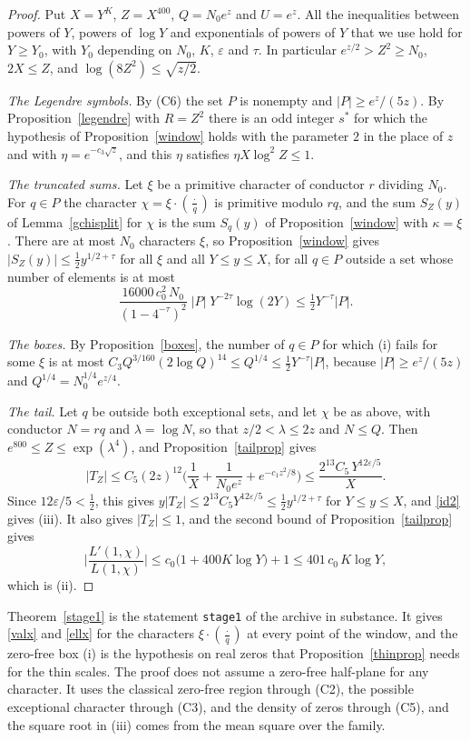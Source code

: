 \documentclass[11pt,letterpaper]{article}
\numberwithin{equation}{section}
\begin{document}
\begin{proof}
Put $X=Y^K$, $Z=X^{400}$, $Q=N_0e^z$ and $U=e^z$. All the inequalities between powers of $Y$, powers of $\log Y$ and exponentials of powers of $Y$ that we use hold for $Y\ge Y_0$, with $Y_0$ depending on $N_0$, $K$, $\varepsilon$ and $\tau$. In particular $e^{z/2}>Z^2\ge N_0$, $2X\le Z$, and $\log(8Z^2)\le\sqrt{z/2}$.

\emph{The Legendre symbols.} By (C6) the set $P$ is nonempty and $|P|\ge e^z/(5z)$. By Proposition~\ref{legendre} with $R=Z^2$ there is an odd integer $s^\ast$ for which the hypothesis of Proposition~\ref{window} holds with the parameter $2$ in the place of $z$ and with $\eta=e^{-c_3\sqrt z}$, and this $\eta$ satisfies $\eta X\log^2Z\le1$.

\emph{The truncated sums.} Let $\xi$ be a primitive character of conductor $r$ dividing $N_0$. For $q\in P$ the character $\chi=\xi\cdot(\tfrac{\cdot}{q})$ is primitive modulo $rq$, and the sum $S_Z(y)$ of Lemma~\ref{gchisplit} for $\chi$ is the sum $S_q(y)$ of Proposition~\ref{window} with $\kappa=\xi$. There are at most $N_0$ characters $\xi$, so Proposition~\ref{window} gives $|S_Z(y)|\le\tfrac12y^{1/2+\tau}$ for all $\xi$ and all $Y\le y\le X$, for all $q\in P$ outside a set whose number of elements is at most
\[
\frac{16000\,c_0^2\,N_0}{(1-4^{-\tau})^2}\;|P|\;Y^{-2\tau}\log(2Y)\le\tfrac12Y^{-\tau}|P| .
\]

\emph{The boxes.} By Proposition~\ref{boxes}, the number of $q\in P$ for which (i) fails for some $\xi$ is at most $C_3Q^{3/160}(2\log Q)^{14}\le Q^{1/4}\le\tfrac12Y^{-\tau}|P|$, because $|P|\ge e^z/(5z)$ and $Q^{1/4}=N_0^{1/4}e^{z/4}$.

\emph{The tail.} Let $q$ be outside both exceptional sets, and let $\chi$ be as above, with conductor $N=rq$ and $\lambda=\log N$, so that $z/2<\lambda\le2z$ and $N\le Q$. Then $e^{800}\le Z\le\exp(\lambda^4)$, and Proposition~\ref{tailprop} gives
\[
|T_Z|\le C_5(2z)^{12}\Big(\frac1X+\frac1{N_0e^z}+e^{-c_1z^2/8}\Big)\le\frac{2^{13}C_5\,Y^{12\varepsilon/5}}X .
\]
Since $12\varepsilon/5<\tfrac12$, this gives $y|T_Z|\le2^{13}C_5Y^{12\varepsilon/5}\le\tfrac12y^{1/2+\tau}$ for $Y\le y\le X$, and \eqref{id2} gives (iii). It also gives $|T_Z|\le1$, and the second bound of Proposition~\ref{tailprop} gives
\[
\Big|\frac{L'(1,\chi)}{L(1,\chi)}\Big|\le c_0\big(1+400K\log Y\big)+1\le401\,c_0\,K\log Y ,
\]
which is (ii).
\end{proof}

Theorem~\ref{stage1} is the statement \texttt{stage1} of the archive in substance. It gives \eqref{valx} and \eqref{ellx} for the characters $\xi\cdot(\tfrac{\cdot}{q})$ at every point of the window, and the zero-free box (i) is the hypothesis on real zeros that Proposition~\ref{thinprop} needs for the thin scales. The proof does not assume a zero-free half-plane for any character. It uses the classical zero-free region through (C2), the possible exceptional character through (C3), and the density of zeros through (C5), and the square root in (iii) comes from the mean square over the family.
\end{document}
